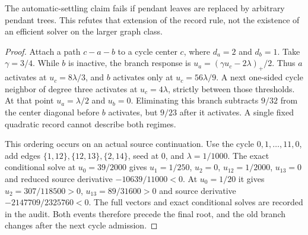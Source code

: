 \begin{proposition}
\label{prop:op3-cycle-unsettled-attachment}
The automatic-settling claim fails if pendant leaves are replaced by
arbitrary pendant trees. This refutes that extension of the record rule,
not the existence of an efficient solver on the larger graph class.
\end{proposition}
\begin{proof}
Attach a path $c-a-b$ to a cycle center $c$, where $d_a=2$ and $d_b=1$.
Take $\gamma=3/4$. While $b$ is inactive, the branch response is
$u_a=(\gamma u_c-2\lambda)_+/2$. Thus $a$ activates at
$u_c=8\lambda/3$, and $b$ activates only at $u_c=56\lambda/9$.
A next one-sided cycle neighbor of degree three activates at
$u_c=4\lambda$, strictly between those thresholds. At that point
$u_a=\lambda/2$ and $u_b=0$. Eliminating this branch subtracts $9/32$
from the center diagonal before $b$ activates, but $9/23$ after it
activates. A single fixed quadratic record cannot describe both regimes.

This ordering occurs on an actual source continuation. Use the cycle
$0,1,\ldots,11,0$, add edges $\{1,12\},\{12,13\},\{2,14\}$, seed at
$0$, and $\lambda=1/1000$. The exact conditional solve at
$u_0=39/2000$ gives $u_1=1/250$, $u_2=0$, $u_{12}=1/2000$, $u_{13}=0$
and reduced source derivative $-10639/11000<0$. At $u_0=1/20$ it gives
$u_2=307/118500>0$, $u_{13}=89/31600>0$ and source derivative
$-2147709/2325760<0$. The full vectors and exact conditional
solves are recorded in the audit. Both events therefore precede
the final root, and the old branch changes after the next cycle admission.
\end{proof}
